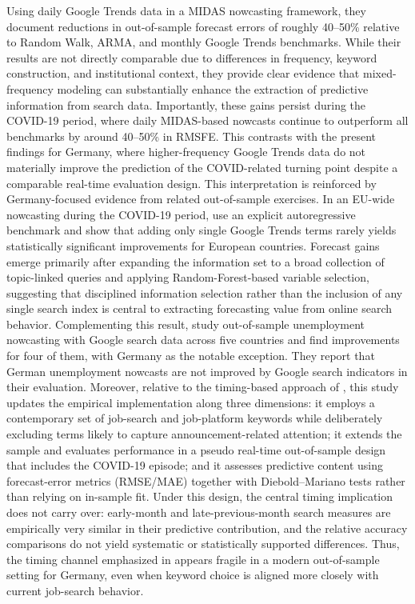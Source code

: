 \documentclass[12pt,a4paper]{article}
\begin{document}
Using daily Google Trends data in a MIDAS nowcasting framework, they document reductions in out-of-sample forecast errors of roughly 40--50\% relative to Random Walk, ARMA, and monthly Google Trends benchmarks. While their results are not directly comparable due to differences in frequency, keyword construction, and institutional context, they provide clear evidence that  mixed-frequency modeling can substantially enhance the extraction of predictive information from search data.
Importantly, these gains persist during the COVID-19 period, where daily MIDAS-based nowcasts continue to outperform all benchmarks by around 40--50\% in RMSFE. This contrasts with the present findings for Germany, where higher-frequency Google Trends data do not materially improve the prediction of the COVID-related turning point despite a comparable real-time evaluation design.
This interpretation is reinforced by Germany-focused evidence from related out-of-sample exercises. In an EU-wide nowcasting during the COVID-19 period, \citet{caperna2020googling} use an explicit autoregressive benchmark and show that adding only single Google Trends terms rarely yields statistically significant improvements for European countries. Forecast gains emerge primarily after expanding the information set to a broad collection of topic-linked queries and applying Random-Forest-based variable selection, suggesting that disciplined information selection rather than the inclusion of any single search index is central to extracting forecasting value from online search behavior.
Complementing this result, \citet{niesert2020can} study out-of-sample unemployment nowcasting with Google search data across five countries and find improvements for four of them, with Germany as the notable exception. They report that German unemployment nowcasts are not improved by Google search indicators in their evaluation. Moreover, relative to the timing-based approach of \citet{Askitas}, this study updates the empirical implementation along three dimensions: it employs a contemporary set of job-search and job-platform keywords while deliberately excluding terms likely to capture announcement-related attention; it extends the sample and evaluates performance in a pseudo real-time out-of-sample design that includes the COVID-19 episode; and it assesses predictive content using forecast-error metrics (RMSE/MAE) together with Diebold--Mariano tests rather than relying on in-sample fit. Under this design, the central timing implication does not carry over: early-month and late-previous-month search measures are empirically very similar in their predictive contribution, and the relative accuracy comparisons do not yield systematic or statistically supported differences. Thus, the timing channel emphasized in \citet{Askitas} appears fragile in a modern out-of-sample setting for Germany, even when keyword choice is aligned more closely with current job-search behavior.
\end{document}
